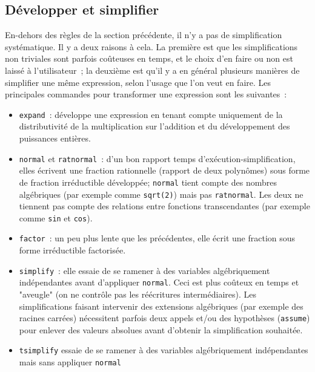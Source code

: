 \documentclass{article}
\begin{document}
\begin{giacjshere}
\subsection{D\'evelopper et simplifier}
%
En-dehors des r\`egles de la section pr\'ec\'edente,
il n'y a pas de simplification syst\'ematique. 
Il y a deux raisons \`a cela. La premi\`ere est que les 
simplifications non triviales sont parfois
co\^uteuses en temps, et le choix d'en faire ou non est laiss\'e 
\`a l'utilisateur~;
la deuxi\`eme est qu'il y a en g\'en\'eral plusieurs mani\`eres de
simplifier une m\^eme expression, selon l'usage que l'on veut en
faire. 
Les principales commandes pour transformer une expression 
sont les suivantes~:
\begin{itemize}
\item
{}
\verb|expand|~: d\'eveloppe une expression en tenant compte 
uniquement de la distributivit\'e de la multiplication sur l'addition et
du d\'eveloppement des puissances enti\`eres.
\item
{}
\verb|normal| et \verb|ratnormal|~: 
d'un bon rapport temps d'ex\'ecution-simplification, elles
\'ecrivent une fraction rationnelle (rapport de deux polyn\^omes)
sous forme de fraction irr\'eductible d\'evelopp\'ee; \verb|normal|
tient compte des nombres alg\'ebriques (par exemple comme \verb|sqrt(2)|)
mais pas \verb|ratnormal|. Les deux ne tiennent pas compte des relations
entre fonctions transcendantes (par exemple comme \verb|sin| et \verb|cos|).
\item 
{}
\verb|factor|~: un peu plus lente que les pr\'ec\'edentes, elle
\'ecrit une fraction sous forme irr\'eductible factoris\'ee.
\item 
{}
\verb|simplify|~: elle essaie de se ramener \`a
des variables alg\'ebriquement ind\'ependantes avant d'appliquer
\verb|normal|. Ceci est plus co\^uteux en temps et "aveugle" (on
ne contr\^ole pas les r\'e\'ecritures interm\'ediaires).
Les simplifications faisant intervenir des extensions
alg\'ebriques (par exemple des racines carr\'ees) 
n\'ecessitent parfois deux appels et/ou des hypoth\`eses (\verb|assume|)
pour enlever des valeurs absolues avant d'obtenir la simplification
souhait\'ee.
\item 
{}
\verb|tsimplify| essaie de se ramener \`a des variables 
alg\'ebriquement ind\'ependantes mais sans appliquer \verb|normal|

\end{itemize}
\end{giacjshere}
\end{document}
